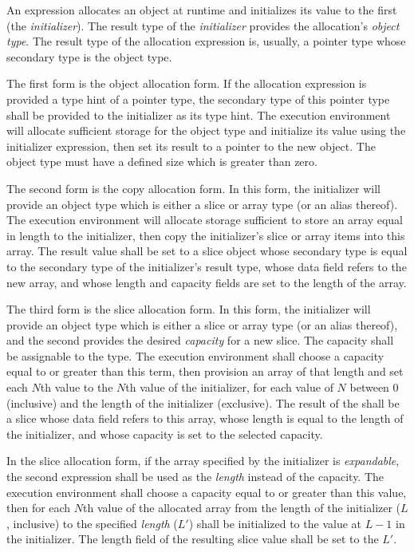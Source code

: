 \specsubsubitem
An  expression allocates an object at runtime and initializes
its value to the first  (the \textit{initializer}). The
result type of the \textit{initializer} provides the allocation's
\textit{object type}. The result type of the allocation expression is, usually,
a pointer type whose secondary type is the object type.

\specsubsubitem
The first form is the object allocation form. If the allocation expression is
provided a type hint of a pointer type, the secondary type of this pointer type
shall be provided to the initializer as its type hint. The execution
environment will allocate sufficient storage for the object type and initialize
its value using the initializer expression, then set its result to a pointer to
the new object. The object type must have a defined size which is greater than
zero.

\specsubsubitem
The second form is the copy allocation form. In this form, the initializer will
provide an object type which is either a slice or array type (or an alias
thereof). The execution environment will allocate storage sufficient to store
an array equal in length to the initializer, then copy the initializer's slice
or array items into this array. The result value shall be set to a slice object
whose secondary type is equal to the secondary type of the initializer's result
type, whose data field refers to the new array, and whose length and capacity
fields are set to the length of the array.

\specsubsubitem
The third form is the slice allocation form. In this form, the initializer will
provide an object type which is either a slice or array type (or an alias
thereof), and the second  provides the desired
\textit{capacity} for a new slice. The capacity shall be assignable to the
 type. The execution environment shall choose a capacity equal
to or greater than this term, then provision an array of that length and set
each $N$th value to the $N$th value of the initializer, for each value of $N$
between $0$ (inclusive) and the length of the initializer (exclusive). The
result of the  shall be a slice whose data
field refers to this array, whose length is equal to the length of the
initializer, and whose capacity is set to the selected capacity.

\specsubsubitem
In the slice allocation form, if the array specified by the initializer is
\textit{expandable}, the second expression shall be used as the \textit{length}
instead of the capacity. The execution environment shall choose a capacity
equal to or greater than this value, then for each $N$th value of the allocated
array from the length of the initializer ($L$, inclusive) to the specified
\textit{length} ($L'$) shall be initialized to the value at $L-1$ in the
initializer. The length field of the resulting slice value shall be set to the
$L'$.

